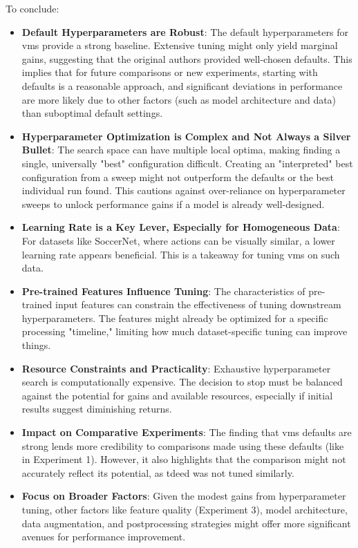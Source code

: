 To conclude:
\begin{itemize}
    \item \textbf{Default Hyperparameters are Robust}: The default hyperparameters for \acrshort{vms} provide a strong baseline. Extensive tuning might only yield marginal gains, suggesting that the original authors provided well-chosen defaults. This implies that for future comparisons or new experiments, starting with defaults is a reasonable approach, and significant deviations in performance are more likely due to other factors (such as model architecture and data) than suboptimal default settings.
    \item \textbf{Hyperparameter Optimization is Complex and Not Always a Silver Bullet}: The search space can have multiple local optima, making finding a single, universally "best" configuration difficult. Creating an "interpreted" best configuration from a sweep might not outperform the defaults or the best individual run found. This cautions against over-reliance on hyperparameter sweeps to unlock performance gains if a model is already well-designed.
    \item \textbf{Learning Rate is a Key Lever, Especially for Homogeneous Data}: For datasets like SoccerNet, where actions can be visually similar, a lower learning rate appears beneficial. This is a takeaway for tuning \acrshort{vms} on such data.
    \item \textbf{Pre-trained Features Influence Tuning}: The characteristics of pre-trained input features can constrain the effectiveness of tuning downstream hyperparameters. The features might already be optimized for a specific processing "timeline," limiting how much dataset-specific tuning can improve things.
    \item \textbf{Resource Constraints and Practicality}: Exhaustive hyperparameter search is computationally expensive. The decision to stop must be balanced against the potential for gains and available resources, especially if initial results suggest diminishing returns.
    \item \textbf{Impact on Comparative Experiments}: The finding that \acrshort{vms} defaults are strong lends more credibility to comparisons made using these defaults (like in Experiment 1). However, it also highlights that the comparison might not accurately reflect its potential, as \acrshort{tdeed} was not tuned similarly.
    \item \textbf{Focus on Broader Factors}: Given the modest gains from hyperparameter tuning, other factors like feature quality (Experiment 3), model architecture, data augmentation, and postprocessing strategies might offer more significant avenues for performance improvement.
\end{itemize}

